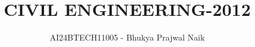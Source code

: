 \documentclass[journal]{IEEEtran}
\begin{document}

\vspace{3cm}

\title{CIVIL ENGINEERING-2012}
\author{AI24BTECH11005 - Bhukya Prajwal Naik
}
{\let\newpage\relax\maketitle}

\renewcommand{\thefigure}{\theenumi}
\renewcommand{\thetable}{\theenumi}
\setlength{\intextsep}{10pt} %


\renewcommand{\thetable}{\theenumi}
\end{document}
